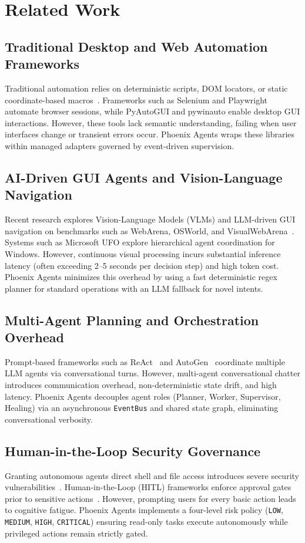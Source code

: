 \documentclass[conference]{IEEEtran}
\begin{document}
\section{Related Work}

\subsection{Traditional Desktop and Web Automation Frameworks}
Traditional automation relies on deterministic scripts, DOM locators, or static coordinate-based macros~\cite{garcia2026}. Frameworks such as Selenium and Playwright automate browser sessions, while PyAutoGUI and pywinauto enable desktop GUI interactions. However, these tools lack semantic understanding, failing when user interfaces change or transient errors occur. Phoenix Agents wraps these libraries within managed adapters governed by event-driven supervision.

\subsection{AI-Driven GUI Agents and Vision-Language Navigation}
Recent research explores Vision-Language Models (VLMs) and LLM-driven GUI navigation on benchmarks such as WebArena, OSWorld, and VisualWebArena~\cite{nguyen2025,zhou2023,koh2024}. Systems such as Microsoft UFO explore hierarchical agent coordination for Windows. However, continuous visual processing incurs substantial inference latency (often exceeding 2--5 seconds per decision step) and high token cost. Phoenix Agents minimizes this overhead by using a fast deterministic regex planner for standard operations with an LLM fallback for novel intents.

\subsection{Multi-Agent Planning and Orchestration Overhead}
Prompt-based frameworks such as ReAct~\cite{yao2023} and AutoGen~\cite{wu2024} coordinate multiple LLM agents via conversational turns. However, multi-agent conversational chatter introduces communication overhead, non-deterministic state drift, and high latency. Phoenix Agents decouples agent roles (Planner, Worker, Supervisor, Healing) via an asynchronous \texttt{EventBus} and shared state graph, eliminating conversational verbosity.

\subsection{Human-in-the-Loop Security Governance}
Granting autonomous agents direct shell and file access introduces severe security vulnerabilities~\cite{bajoria2026}. Human-in-the-Loop (HITL) frameworks enforce approval gates prior to sensitive actions~\cite{bajoria2026,wu2024}. However, prompting users for every basic action leads to cognitive fatigue. Phoenix Agents implements a four-level risk policy (\texttt{LOW}, \texttt{MEDIUM}, \texttt{HIGH}, \texttt{CRITICAL}) ensuring read-only tasks execute autonomously while privileged actions remain strictly gated.
\end{document}
